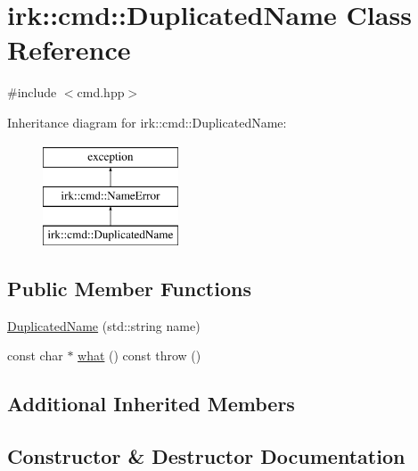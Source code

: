 \hypertarget{classirk_1_1cmd_1_1DuplicatedName}{}\section{irk\+:\+:cmd\+:\+:Duplicated\+Name Class Reference}
\label{classirk_1_1cmd_1_1DuplicatedName}


{\ttfamily \#include $<$cmd.\+hpp$>$}

Inheritance diagram for irk\+:\+:cmd\+:\+:Duplicated\+Name\+:\begin{figure}[H]
\begin{center}
\leavevmode
\includegraphics[height=3.000000cm]{classirk_1_1cmd_1_1DuplicatedName}
\end{center}
\end{figure}
\subsection*{Public Member Functions}
\begin{DoxyCompactItemize}
\item 
\mbox{\hyperlink{classirk_1_1cmd_1_1DuplicatedName_ab65d022bedb856cfb1c34b8a5307ce9d}{Duplicated\+Name}} (std\+::string name)
\item 
const char $\ast$ \mbox{\hyperlink{classirk_1_1cmd_1_1DuplicatedName_a0c780a6365c501318eb970ad9fe2b679}{what}} () const  throw ()
\end{DoxyCompactItemize}
\subsection*{Additional Inherited Members}


\subsection{Constructor \& Destructor Documentation}
\mbox{\label{classirk_1_1cmd_1_1DuplicatedName_ab65d022bedb856cfb1c34b8a5307ce9d}} 
